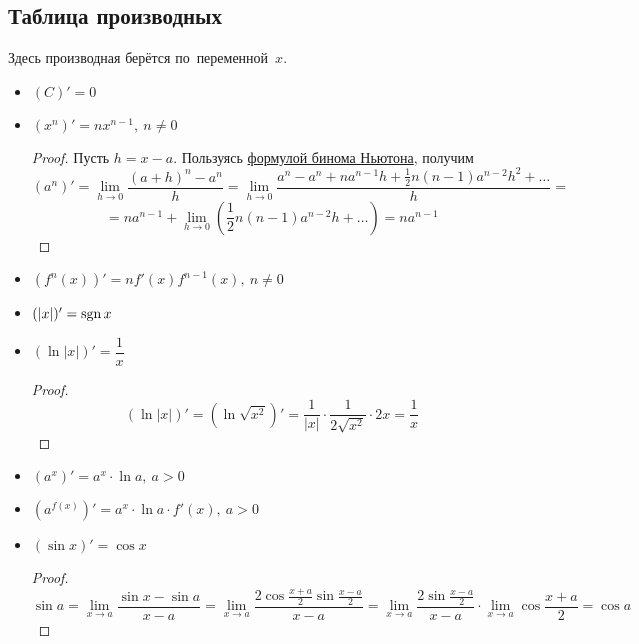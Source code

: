 \subsection{Таблица производных}
Здесь производная берётся по~переменной~$x$.
\begin{itemize}
	\item $(C)' = 0$
	
	\item $(x^n)' = nx^{n-1}, \ n \neq 0$
	\begin{proof}
	Пусть $h = x - a$.
	Пользуясь \hyperref[eq:binomial_expansion]{формулой бинома Ньютона}, получим
	\begin{equation*}
	(a^n)' =
	\lim_{h \to 0} \frac{(a + h)^n - a^n}h =
	\lim_{h \to 0} \frac{a^n - a^n + n a^{n-1} h + \frac12 n(n - 1) a^{n-2} h^2 + \ldots}h =
	\end{equation*}
	\begin{equation*}
	= n a^{n-1} + \lim_{h \to 0} \left( \frac12 n(n - 1) a^{n-2} h + \ldots \right) =
	n a^{n-1}
	\end{equation*}
	\end{proof}
	
	\item $(f^n(x))' = nf'(x)f^{n-1}(x), \ n \neq 0$
	
	\item $(|x|)' = \operatorname{sgn} x$
		
	\item $(\ln |x|)' = \dfrac1x$
	\begin{proof}
	\begin{equation*}
	(\ln |x|)' = (\ln \sqrt{x^2})' = \frac1{|x|} \cdot \frac1{2\sqrt{x^2}} \cdot 2x = \frac1x
	\end{equation*}
	\end{proof}
	
	\item $(a^x)' = a^x \cdot \ln a, \ a > 0$
	
	\item $(a^{f(x)})' = a^x \cdot \ln a \cdot f'(x), \ a > 0$
	
	\item $(\sin x)' = \cos x$
	\begin{proof}
	\begin{equation*}
	\sin a =
	\lim_{x \to a} \frac{\sin x - \sin a}{x - a} =
	\lim_{x \to a} \frac{2 \cos \frac{x + a}2 \sin \frac{x - a}2}{x - a} =
	\lim_{x \to a} \frac{2 \sin \frac{x - a}2}{x - a} \cdot \lim_{x \to a} \cos \frac{x + a}2 =
	\cos a
	\end{equation*}
	\end{proof}
	

\end{itemize}
